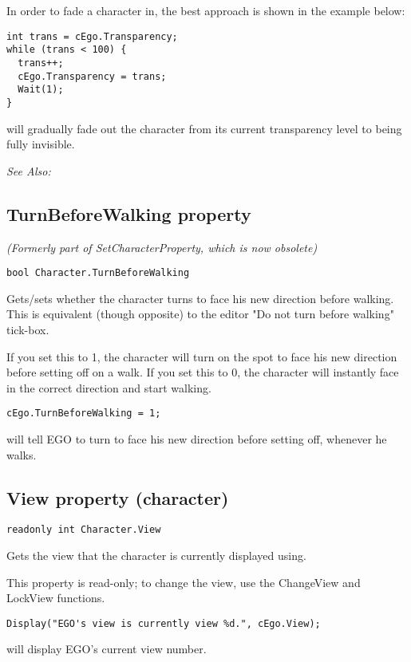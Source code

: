 In order to fade a character in, the best approach is shown in the example below:

\begin{verbatim}
int trans = cEgo.Transparency;
while (trans < 100) {
  trans++;
  cEgo.Transparency = trans;
  Wait(1);
}
\end{verbatim}
will gradually fade out the character from its current transparency level to being fully
invisible.

\it{See Also:} 


\subsection{TurnBeforeWalking property}\label{Character.TurnBeforeWalking}%

\it{(Formerly part of SetCharacterProperty, which is now obsolete)}

\begin{verbatim}
bool Character.TurnBeforeWalking
\end{verbatim}
Gets/sets whether the character turns to face his new direction before walking. This
is equivalent (though opposite) to the editor "Do not turn before walking" tick-box.

If you set this to 1, the character will turn on the spot to face his new direction
before setting off on a walk. If you set this to 0, the character will instantly face
in the correct direction and start walking.

\begin{verbatim}
cEgo.TurnBeforeWalking = 1;
\end{verbatim}
will tell EGO to turn to face his new direction before setting off, whenever he walks.


\subsection{View property (character)}\label{Character.View}%

\begin{verbatim}
readonly int Character.View
\end{verbatim}
Gets the view that the character is currently displayed using.

This property is read-only; to change the view, use the ChangeView and LockView functions.

\begin{verbatim}
Display("EGO's view is currently view %d.", cEgo.View);
\end{verbatim}
will display EGO's current view number.

